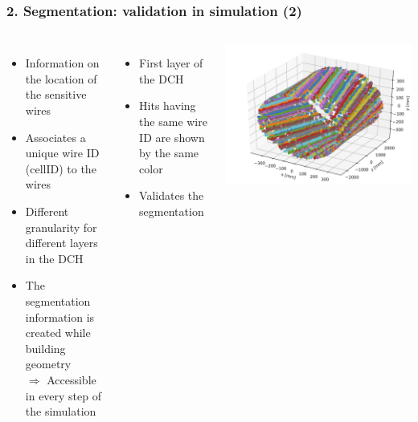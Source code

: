 \documentclass[aspectratio=169, hyperref={colorlinks=true,pdfpagelabels=false,linkcolor=black}, xcolor=dvipsnames,10pt]{beamer}
\begin{document}
\begin{frame}
	\frametitle{2. Segmentation: validation in simulation (2)}
		
	\begin{columns}[t]
		\begin{itemize}
		\item Information on the location of the sensitive wires \vspace{0.2cm}
		\item Associates a unique wire ID (cellID) to the wires \vspace{0.2cm}
		\item Different granularity for different layers in the DCH \vspace{0.2cm}
		\item The segmentation information is created while building geometry \vspace{0.2cm} \\
			$\Rightarrow$ Accessible in every step of the simulation
		\end{itemize}
	
		\begin{itemize}
		\item First layer of the DCH
		\item Hits having the same wire ID are shown by the same color
		\item Validates the segmentation
		\end{itemize}
		\centering
		\includegraphics[width=\textwidth]{../figures/allHits}
	\end{columns}
	
\end{frame}
\end{document}
